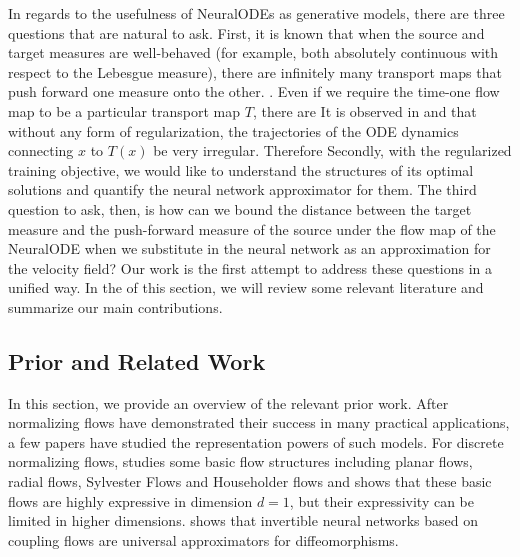 In regards to the usefulness of NeuralODEs as generative models, there
are three questions that are natural to ask. First, %
it is known that when the source and target measures are well-behaved
(for example, both absolutely continuous with respect to the Lebesgue
measure), there are  infinitely many transport maps
that push forward one measure onto the other. . Even if we require the
time-one flow map  to be a particular transport
map $T$, there are 
It is observed in \cite{OTFlow} and \cite{HowToTrain} that without any form of regularization, the trajectories of the ODE dynamics connecting $x$ to $T(x)$  be very irregular. %
Therefore
Secondly, with the regularized training objective, we would like to
understand the structures of its optimal solutions and quantify the
neural network approximator for them. The third question to ask, then,
is how can we bound the distance between the target measure and the
push-forward measure of the source under the flow map of the NeuralODE
when we substitute in the neural network as an approximation for the
velocity field? Our work is the first attempt to address these
questions in a unified way. In the  of this section, we
will review some relevant literature and summarize our main
contributions.


\subsection{Prior and Related Work}
In this section, we provide an overview of the  relevant prior work. After normalizing flows have demonstrated their success in many practical applications, a few papers have studied the representation powers of such models. For discrete normalizing flows, \cite{DisAppro2} studies some basic flow structures including planar flows, radial flows, Sylvester Flows and Householder flows and shows that these basic flows are highly expressive in dimension $d = 1$, but their expressivity can be limited in higher dimensions. \cite{DisAppro1} shows that invertible neural networks based on coupling flows are universal approximators for diffeomorphisms. 

